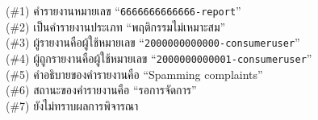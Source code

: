 \begin{minipage}{\textwidth}
\begin{description}[labelwidth=*]
    \item[$ \Rightarrow $] (\#1) คำรายงานหมายเลข ``\texttt{6666666666666-report}''\\
(\#2) เป็นคำรายงานประเภท ``พฤติกรรมไม่เหมาะสม''\\
(\#3) ผู้รายงานคือผู้ใช้หมายเลข ``\texttt{2000000000000-consumeruser}''\\
(\#4) ผู้ถูกรายงานคือผู้ใช้หมายเลข ``\texttt{2000000000001-consumeruser}''\\
(\#5) คำอธิบายของคำรายงานคือ ``Spamming complaints''\\
(\#6) สถานะของคำรายงานคือ ``รอการจัดการ''\\
(\#7) ยังไม่ทราบผลการพิจารณา
\end{description}
\end{minipage}


\vspace{3\baselineskip}


